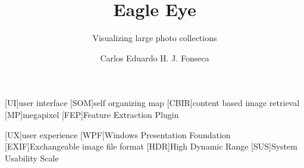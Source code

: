 \documentclass{llncs}
\begin{document}
\pagestyle{plain}


\newcommand{\alog}{Action Logging}

[UI]{user interface}
[SOM]{self organizing map}
[CBIR]{content based image retrieval}
[MP]{megapixel}
[FEP]{Feature Extraction Plugin}

[UX]{user experience}
[WPF]{Windows Presentation Foundation}
[EXIF]{Exchangeable image file format}
[HDR]{High Dynamic Range}
[SUS]{System Usability Scale}


\newcommand{\todo}[1]{\textcolor{red}{TODO: #1}}
\newcommand{\red}[1]{\textcolor{red}{#1}}
\newcommand{\super}[1]{\ensuremath{^{\textrm{#1}}}}
\newcommand{\side}[1]{\marginpar{\textcolor{red}{#1}}}
\newcommand{\cm}{\Checkmark}
\newcommand{\fig}[1]{fig. \ref{fig:#1}}
\newcommand{\Fig}[1]{Fig. \ref{fig:#1}}
\newcommand{\hide}[1]{}




\title{Eagle Eye}
\subtitle{Visualizing large photo collections}

\author{Carlos Eduardo H. J. Fonseca}

\maketitle
\end{document}
